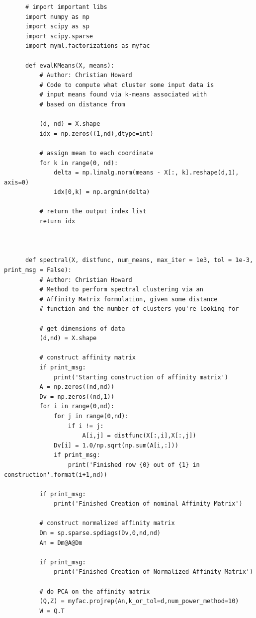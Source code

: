 \documentclass{article}[12pt]
\begin{document}
   
   \begin{verbatim}
      # import important libs
      import numpy as np
      import scipy as sp
      import scipy.sparse
      import myml.factorizations as myfac

      def evalKMeans(X, means):
          # Author: Christian Howard
          # Code to compute what cluster some input data is 
          # input means found via k-means associated with 
          # based on distance from

          (d, nd) = X.shape
          idx = np.zeros((1,nd),dtype=int)

          # assign mean to each coordinate
          for k in range(0, nd):
              delta = np.linalg.norm(means - X[:, k].reshape(d,1), axis=0)
              idx[0,k] = np.argmin(delta)

          # return the output index list
          return idx



      def spectral(X, distfunc, num_means, max_iter = 1e3, tol = 1e-3, print_msg = False):
          # Author: Christian Howard
          # Method to perform spectral clustering via an 
          # Affinity Matrix formulation, given some distance 
          # function and the number of clusters you're looking for

          # get dimensions of data
          (d,nd) = X.shape

          # construct affinity matrix
          if print_msg:
              print('Starting construction of affinity matrix')
          A = np.zeros((nd,nd))
          Dv = np.zeros((nd,1))
          for i in range(0,nd):
              for j in range(0,nd):
                  if i != j:
                      A[i,j] = distfunc(X[:,i],X[:,j])
              Dv[i] = 1.0/np.sqrt(np.sum(A[i,:]))
              if print_msg:
                  print('Finished row {0} out of {1} in construction'.format(i+1,nd))

          if print_msg:
              print('Finished Creation of nominal Affinity Matrix')

          # construct normalized affinity matrix
          Dm = sp.sparse.spdiags(Dv,0,nd,nd)
          An = Dm@A@Dm

          if print_msg:
              print('Finished Creation of Normalized Affinity Matrix')

          # do PCA on the affinity matrix
          (Q,Z) = myfac.projrep(An,k_or_tol=d,num_power_method=10)
          W = Q.T


\end{verbatim}
\end{document}
